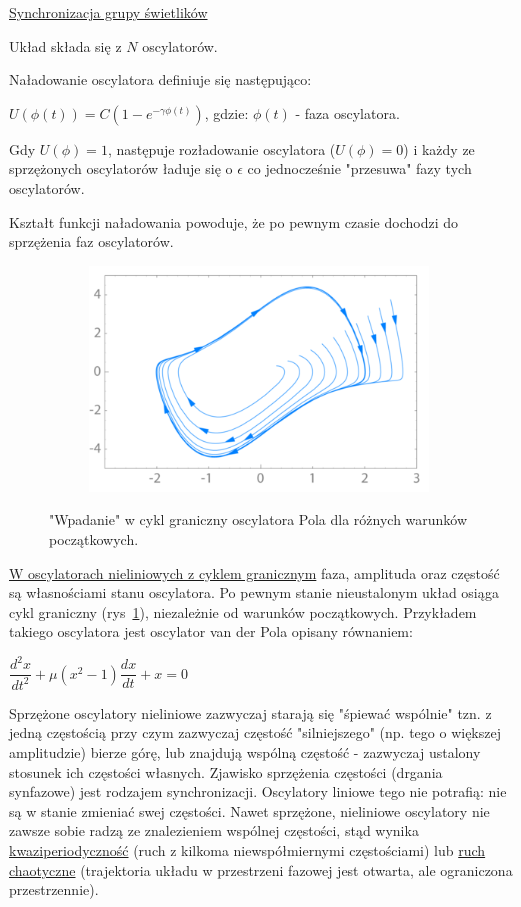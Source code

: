 \underline{Synchronizacja grupy świetlików}

Układ składa się z $ N $ oscylatorów.

Naładowanie oscylatora definiuje się następująco:\newline

$ U(\phi(t)) = C(1 - e^{-\gamma \phi(t)}) $, gdzie:\newline
$ \phi(t) $ - faza oscylatora.

Gdy $ U(\phi) = 1 $, następuje rozładowanie oscylatora ($ U(\phi) = 0 $) i każdy ze sprzężonych oscylatorów ładuje się o $ \epsilon $ co jednocześnie "przesuwa" fazy tych oscylatorów.

Kształt funkcji naładowania powoduje, że po pewnym czasie dochodzi do sprzężenia faz oscylatorów. 
\begin{figure} [H]
	\centering
	\begin{subfigure}{.55\textwidth}
		\centering
		\includegraphics[width=1.0\linewidth]{EDMIIssues/Figures/pol.png}
	\end{subfigure}
	\caption{"Wpadanie" w cykl graniczny oscylatora Pola dla różnych warunków początkowych.}
	\label{pol}
\end{figure}
\underline{W oscylatorach nieliniowych z cyklem granicznym} faza, amplituda oraz częstość są własnościami stanu oscylatora. Po pewnym stanie nieustalonym układ osiąga cykl graniczny (rys~\ref{pol}), niezależnie od warunków początkowych. Przykładem takiego oscylatora jest oscylator van der Pola opisany równaniem:\newline

$ \dfrac{d^2 x}{dt^2} + \mu (x^2 - 1)\dfrac{dx}{dt} + x = 0 $

Sprzężone oscylatory nieliniowe zazwyczaj starają się "śpiewać wspólnie" tzn. z jedną częstością przy czym zazwyczaj częstość "silniejszego" (np. tego o większej amplitudzie) bierze górę, lub znajdują wspólną częstość - zazwyczaj ustalony stosunek ich częstości własnych. Zjawisko sprzężenia częstości (drgania synfazowe) jest rodzajem synchronizacji. Oscylatory liniowe tego nie potrafią: nie są w stanie zmieniać swej częstości. Nawet sprzężone, nieliniowe oscylatory nie zawsze sobie radzą ze znalezieniem wspólnej częstości, stąd wynika \underline{kwaziperiodyczność} (ruch z kilkoma niewspółmiernymi częstościami)  lub \underline{ruch chaotyczne} (trajektoria układu w przestrzeni fazowej jest otwarta, ale ograniczona przestrzennie).

